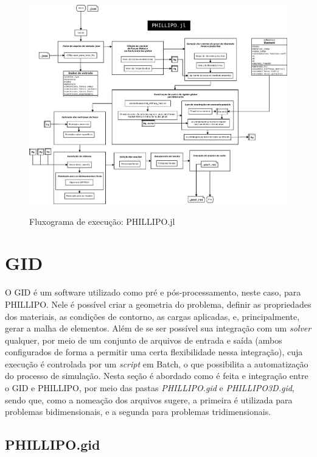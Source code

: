 \begin{figure}
    \centering
    \caption{Fluxograma de execução: PHILLIPO.jl}
    \includegraphics[width = \textwidth]{Figuras/fluxograma_PHILLIPO.pdf}
    \label{fig:fluxograma_PHILLIPO}
\end{figure}

\section{GID}

O GID é um software utilizado como pré e pós-processamento, neste caso, para PHILLIPO. Nele é possível criar a geometria do problema, definir as propriedades dos materiais, as condições de contorno, as cargas aplicadas, e, principalmente, gerar a malha de elementos. Além de se ser possível sua integração com um \emph{solver} qualquer, por meio de um conjunto de arquivos de entrada e saída (ambos configurados de forma a permitir uma certa flexibilidade nessa integração), cuja execução é controlada por um \emph{script} em Batch, o que possibilita a automatização do processo de simulação. Nesta seção é abordado como é feita e integração entre o GID e PHILLIPO, por meio das pastas \emph{PHILLIPO.gid} e \emph{PHILLIPO3D.gid}, sendo que, como a nomeação dos arquivos sugere, a primeira é utilizada para problemas bidimensionais, e a segunda para problemas tridimensionais.

\subsection{PHILLIPO.gid}

